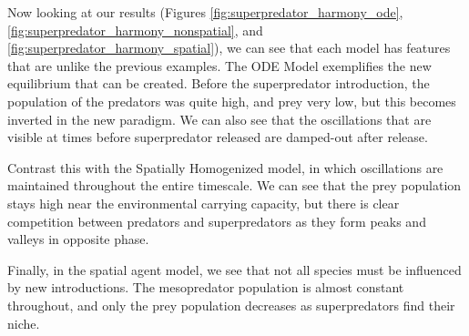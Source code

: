 \documentclass[journal]{IEEEtran}
\begin{document}
Now looking at our results (Figures \ref{fig:superpredator_harmony_ode}, \ref{fig:superpredator_harmony_nonspatial}, and \ref{fig:superpredator_harmony_spatial}), we can see that each model has features that are unlike the previous examples. The ODE Model exemplifies the new equilibrium that can be created. Before the superpredator introduction, the population of the predators was quite high, and prey very low, but this becomes inverted in the new paradigm. We can also see that the oscillations that are visible at times before superpredator released are damped-out after release.\par
Contrast this with the Spatially Homogenized model, in which oscillations are maintained throughout the entire timescale. We can see that the prey population stays high near the environmental carrying capacity, but there is clear competition between predators and superpredators as they form peaks and valleys in opposite phase.\par
Finally, in the spatial agent model, we see that not all species must be influenced by new introductions. The mesopredator population is almost constant throughout, and only the prey population decreases as superpredators find their niche.
\end{document}
